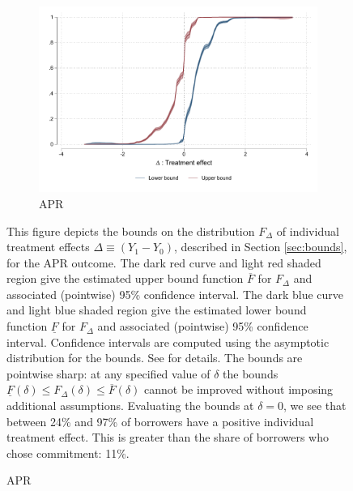\documentclass[oneside,11pt]{article}
\begin{document}
\vspace{.3in}
\begin{figure}[H]
    \caption{Fan \& Park bounds for benefit in APR\%}
    \label{fan_park_bounds}
    \begin{center}
    \begin{subfigure}{0.75\textwidth}
        \caption{APR}
        \centering
        \includegraphics[width=\textwidth]{Figuras/fan_park_bounds_apr.pdf}
    \end{subfigure}
    \end{center}
        \scriptsize
    This figure depicts the \cite{fan2010sharp} bounds on the distribution $F_\Delta$ of individual treatment effects $\Delta \equiv (Y_1 - Y_0)$, described in Section \ref{sec:bounds}, for the APR outcome.
    The dark red curve and light red shaded region give the estimated upper bound function $\overline{F}$ for $F_\Delta$ and associated (pointwise) 95\% confidence interval. 
    The dark blue curve and light blue shaded region give the estimated lower bound function $\underline{F}$ for $F_\Delta$ and associated (pointwise) 95\% confidence interval.
    Confidence intervals are computed using the asymptotic distribution for the bounds. See \cite{fan2010sharp} for details.
    The bounds are pointwise sharp: at any specified value of $\delta$ the bounds $\underline{F}(\delta) \leq F_\Delta(\delta) \leq \overline{F}(\delta)$ cannot be improved without imposing additional assumptions.
    Evaluating the bounds at $\delta = 0$, we see that between 24\% and 97\% of borrowers have a positive individual treatment effect.
    This is greater than the share of borrowers who chose commitment: 11\%.
\end{figure}
\end{document}
